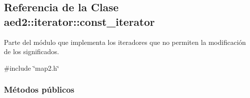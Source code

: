 \hypertarget{classaed2_1_1iterator_1_1const__iterator}{\subsection{\-Referencia de la \-Clase aed2\-:\-:iterator\-:\-:const\-\_\-iterator}
\label{classaed2_1_1iterator_1_1const__iterator}
}


\-Parte del módulo que implementa los iteradores que no permiten la modificación de los significados.  




{\ttfamily \#include \char`\"{}map2.\-h\char`\"{}}

\subsubsection*{\-Métodos públicos}
